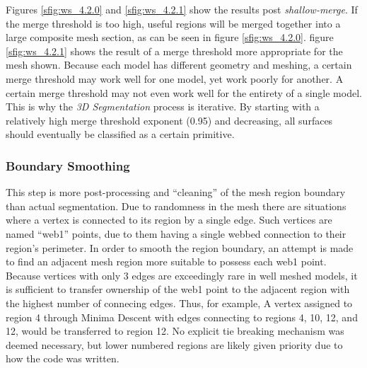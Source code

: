 Figures \ref{sfig:ws_4.2.0} and \ref{sfig:ws_4.2.1} show the results post \textit{shallow-merge}.
If the merge threshold is too high, useful regions will be merged together into a large composite mesh section, as can be seen in figure \ref{sfig:ws_4.2.0}.
figure \ref{sfig:ws_4.2.1} shows the result of a merge threshold more appropriate for the mesh shown.
Because each model has different geometry and meshing, a certain merge threshold may work well for one model, yet work poorly for another.
A certain merge threshold may not even work well for the entirety of a single model.
This is why the \textit{3D Segmentation} process is iterative.
By starting with a relatively high merge threshold exponent (0.95) and decreasing, all surfaces should eventually be classified as a certain primitive.

\subsubsection{Boundary Smoothing}
This step is more post-processing and ``cleaning'' of the mesh region boundary than actual segmentation.
Due to randomness in the mesh there are situations where a vertex is connected to its region by a single edge.
Such vertices are named ``web1'' points, due to them having a single webbed connection to their region's perimeter.
In order to smooth the region boundary, an attempt is made to find an adjacent mesh region more suitable to possess each web1 point.
Because vertices with only 3 edges are exceedingly rare in well meshed models, it is sufficient to transfer ownership of the web1 point to the adjacent region with the highest number of connecing edges.
Thus, for example, A vertex assigned to region 4 through Minima Descent with edges connecting to regions 4, 10, 12, and 12, would be transferred to region 12.
No explicit tie breaking mechanism was deemed necessary, but lower numbered regions are likely given priority due to how the code was written.


